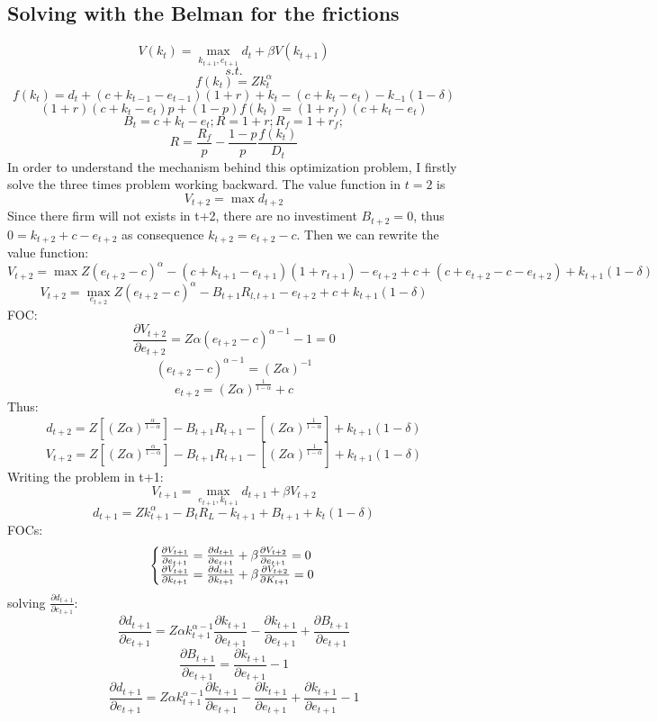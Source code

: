 \documentclass[12pt]{article}
\begin{document}
\subsection{Solving with the Belman for the frictions}
\[V(k_{t}) = \max_{k_{t+1}, e_{t+1}} d_t + \beta V(k_{t+1})\]
\[s.t.\]
\[f(k_t) = Z k_t^\alpha\]
\[f(k_t) = d_t + (c+k_{t-1}-e_{t-1})(1+r) + k_{t} - (c + k_{t}- e_{t}) - k_{-1}(1-\delta)\]
\[(1+r)(c+k_t -e_t)p + (1-p)f(k_t) = (1+r_f)(c+k_t -e_t) \]
\[B_t = c+k_t-e_t; R= 1+r; R_f= 1 + r_f;  \]
\[R=\frac{R_f}{p}  -\frac{ 1-p }{ p }\frac{f(k_t)}{D_t}\]
In order to understand the mechanism behind this optimization problem, I firstly solve the three times problem working
backward.
The value function in \(t=2\) is 
\[ V_{t+2} =  \max d_{t+2}\]
Since there firm will not exists in t+2, there are no investiment \(B_{t+2}=0\), thus \(0=k_{t+2}+c-e_{t+2}\) as
consequence \(k_{t+2} = e_{t+2} - c\). Then we can rewrite the value function:
\[ V_{t+2} = \max Z(e_{t+2} - c)^\alpha - (c+k_{t+1}-e_{t+1})(1+r_{t+1}) - e_{t+2} + c + (c + e_{t+2} - c - e_{t+2}) +
k_{t+1}(1-\delta) \]
\[V_{t+2} = \max_{e_{t+2}} Z(e_{t+2} - c)^\alpha - B_{t+1}R_{l,t+1} - e_{t+2} + c + k_{t+1}(1-\delta) \]
FOC:
\[\frac{\partial V_{t+2}}{\partial e_{t+2}} = Z \alpha (e_{t+2} - c)^{\alpha-1} - 1 = 0\]
\[ (e_{t+2} - c)^{\alpha-1}= (Z \alpha)^{-1}\]
\[ e_{t+2} = (Z \alpha)^{\frac{1}{1-\alpha}}+c\]
Thus:
\[d_{t+2} = Z\left[(Z \alpha)^{\frac{\alpha}{1-\alpha}}\right]  - B_{t+1}R_{t+1} -  \left[(Z
\alpha)^{\frac{1}{1-\alpha}}\right] + k_{t+1}(1-\delta) \]
\[V_{t+2} = Z\left[(Z \alpha)^{\frac{\alpha}{1-\alpha}}\right]  - B_{t+1}R_{t+1} -  \left[(Z
\alpha)^{\frac{1}{1-\alpha}}\right] + k_{t+1}(1-\delta) \]
Writing the problem in t+1:
\[V_{t+1} = \max_{e_{t+1},k_{t+1}} d_{t+1} + \beta V_{t+2}\]
\[d_{t+1} = Zk^\alpha_{t+1} - B_t R_L - k_{t+1} + B_{t+1} + k_t(1-\delta)\]
FOCs:
\begin{equation}
    \left\{\begin{array}{@{}l@{}}
        \frac{\partial V_{t+1}}{\partial e_{t+1}} = \frac{\partial d_{t+1}}{\partial e_{t+1}} + \beta \frac{\partial
            V_{t+2}}{\partial e_{t+1}} = 0  \\
        \frac{\partial V_{t+1}}{\partial k_{t+1}} = \frac{\partial d_{t+1}}{\partial k_{t+1}} + \beta \frac{\partial
            V_{t+2}}{\partial K_{t+1}} = 0 \\
    \end{array} \right .\,
\end{equation}
solving \(\frac{\partial d_{t+1}}{\partial e_{t+1}}\):
\[\frac{\partial d_{t+1}}{\partial e_{t+1}} = Z \alpha k_{t+1} ^{\alpha-1}\frac{\partial k_{t+1}}{\partial e_{t+1}}
 - \frac{\partial k_{t+1}}{\partial e_{t+1}} + \frac{\partial B_{t+1}}{\partial e_{t+1}}\]
\[\frac{\partial B_{t+1}}{\partial e_{t+1}} = \frac{\partial k_{t+1}}{\partial e_{t+1}} - 1\]
\[\frac{\partial d_{t+1}}{\partial e_{t+1}} = Z \alpha k_{t+1} ^{\alpha-1}\frac{\partial k_{t+1}}{\partial e_{t+1}} -
\frac{\partial k_{t+1}}{\partial e_{t+1}} + \frac{\partial k_{t+1}}{\partial e_{t+1}} - 1\]
\end{document}
